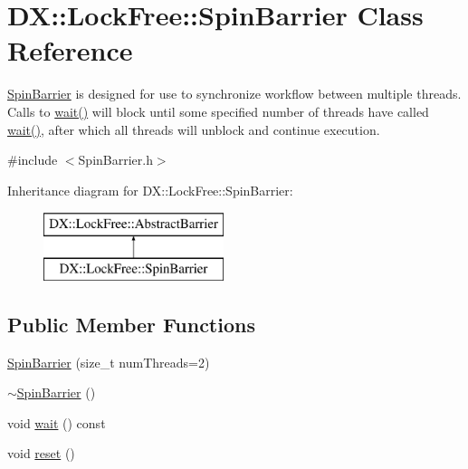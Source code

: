 \hypertarget{class_d_x_1_1_lock_free_1_1_spin_barrier}{\section{D\-X\-:\-:Lock\-Free\-:\-:Spin\-Barrier Class Reference}
\label{class_d_x_1_1_lock_free_1_1_spin_barrier}
}


\hyperlink{class_d_x_1_1_lock_free_1_1_spin_barrier}{Spin\-Barrier} is designed for use to synchronize workflow between multiple threads. Calls to \hyperlink{class_d_x_1_1_lock_free_1_1_spin_barrier_a869688c05d8edae270a0e549c36c163d}{wait()} will block until some specified number of threads have called \hyperlink{class_d_x_1_1_lock_free_1_1_spin_barrier_a869688c05d8edae270a0e549c36c163d}{wait()}, after which all threads will unblock and continue execution.  




{\ttfamily \#include $<$Spin\-Barrier.\-h$>$}

Inheritance diagram for D\-X\-:\-:Lock\-Free\-:\-:Spin\-Barrier\-:\begin{figure}[H]
\begin{center}
\leavevmode
\includegraphics[height=2.000000cm]{class_d_x_1_1_lock_free_1_1_spin_barrier}
\end{center}
\end{figure}
\subsection*{Public Member Functions}
\begin{DoxyCompactItemize}
\item 
\hyperlink{class_d_x_1_1_lock_free_1_1_spin_barrier_acdde1ae097ee3f67636e3da90dae341d}{Spin\-Barrier} (size\-\_\-t num\-Threads=2)
\item 
\hyperlink{class_d_x_1_1_lock_free_1_1_spin_barrier_acbcdf2ddd0a3a682cca03b8950f48db3}{$\sim$\-Spin\-Barrier} ()
\item 
void \hyperlink{class_d_x_1_1_lock_free_1_1_spin_barrier_a869688c05d8edae270a0e549c36c163d}{wait} () const 
\item 
void \hyperlink{class_d_x_1_1_lock_free_1_1_spin_barrier_aea53e68d38677f716835dd5ad80279ba}{reset} ()
\end{DoxyCompactItemize}
